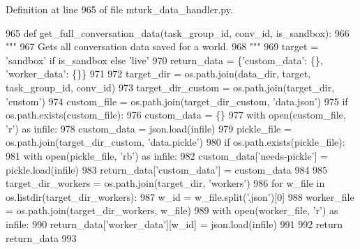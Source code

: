 Definition at line 965 of file mturk\+\_\+data\+\_\+handler.\+py.


\begin{DoxyCode}
965     \textcolor{keyword}{def }get\_full\_conversation\_data(task\_group\_id, conv\_id, is\_sandbox):
966         \textcolor{stringliteral}{"""}
967 \textcolor{stringliteral}{        Gets all conversation data saved for a world.}
968 \textcolor{stringliteral}{        """}
969         target = \textcolor{stringliteral}{'sandbox'} \textcolor{keywordflow}{if} is\_sandbox \textcolor{keywordflow}{else} \textcolor{stringliteral}{'live'}
970         return\_data = \{\textcolor{stringliteral}{'custom\_data'}: \{\}, \textcolor{stringliteral}{'worker\_data'}: \{\}\}
971 
972         target\_dir = os.path.join(data\_dir, target, task\_group\_id, conv\_id)
973         target\_dir\_custom = os.path.join(target\_dir, \textcolor{stringliteral}{'custom'})
974         custom\_file = os.path.join(target\_dir\_custom, \textcolor{stringliteral}{'data.json'})
975         \textcolor{keywordflow}{if} os.path.exists(custom\_file):
976             custom\_data = \{\}
977             with open(custom\_file, \textcolor{stringliteral}{'r') as infile:}
978 \textcolor{stringliteral}{                custom\_data = json.load(infile)}
979 \textcolor{stringliteral}{            pickle\_file = os.path.join(target\_dir\_custom, 'data.pickle'})
980             \textcolor{keywordflow}{if} os.path.exists(pickle\_file):
981                 with open(pickle\_file, \textcolor{stringliteral}{'rb'}) \textcolor{keyword}{as} infile:
982                     custom\_data[\textcolor{stringliteral}{'needs-pickle'}] = pickle.load(infile)
983             return\_data[\textcolor{stringliteral}{'custom\_data'}] = custom\_data
984 
985         target\_dir\_workers = os.path.join(target\_dir, \textcolor{stringliteral}{'workers'})
986         \textcolor{keywordflow}{for} w\_file \textcolor{keywordflow}{in} os.listdir(target\_dir\_workers):
987             w\_id = w\_file.split(\textcolor{stringliteral}{'.json'})[0]
988             worker\_file = os.path.join(target\_dir\_workers, w\_file)
989             with open(worker\_file, \textcolor{stringliteral}{'r') as infile:}
990 \textcolor{stringliteral}{                return\_data['worker\_data'}][w\_id] = json.load(infile)
991 
992         \textcolor{keywordflow}{return} return\_data
993 \end{DoxyCode}
\mbox{\label{classparlai_1_1mturk_1_1core_1_1mturk__data__handler_1_1MTurkDataHandler_a753c4a107539e6085fb2fd8402ed35e2}} 
